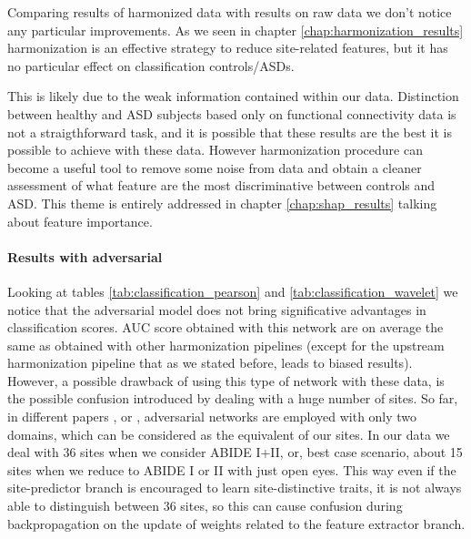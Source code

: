 \documentclass[11pt]{report}
\begin{document}
\hfill

Comparing results of harmonized data with results on raw data we don't notice any particular improvements. 
As we seen in chapter \ref{chap:harmonization_results} harmonization is an effective strategy to reduce site-related features, but it has no particular effect on classification controls/ASDs.

This is likely due to the weak information contained within our data. 
Distinction between healthy and ASD subjects based only on functional connectivity data is not a straigthforward task, and it is possible that these results are the best it is possible to achieve with these data. 
However harmonization procedure can become a useful tool to remove some noise from data and obtain a cleaner assessment of what feature are the most discriminative between controls and ASD. This theme is entirely addressed in chapter \ref{chap:shap_results} talking about feature importance.


\paragraph{Results with adversarial}

\hfill

\noindent Looking at tables \ref{tab:classification_pearson} and \ref{tab:classification_wavelet} we notice that the adversarial model does not bring significative advantages in classification scores. 
AUC score obtained with this network are on average the same as obtained with other harmonization pipelines (except for the upstream harmonization pipeline that as we stated before, leads to biased results).
However, a possible drawback of using this type of network with these data, is the possible confusion introduced by dealing with a huge number of sites.
So far, in different papers \cite{ganin2016}, \cite{kamath2019} or \cite{guan2021},
adversarial networks are employed with only two domains, which can be considered as the equivalent of our sites. 
In our data we deal with 36 sites when we consider ABIDE I+II, or, best case scenario, about 15 sites when we reduce to ABIDE I or II with just open eyes.
This way even if the site-predictor branch is encouraged to learn site-distinctive traits, it is not always able to distinguish between 36 sites, so this can cause confusion during backpropagation on the update of weights related to the feature extractor branch. 
\end{document}
